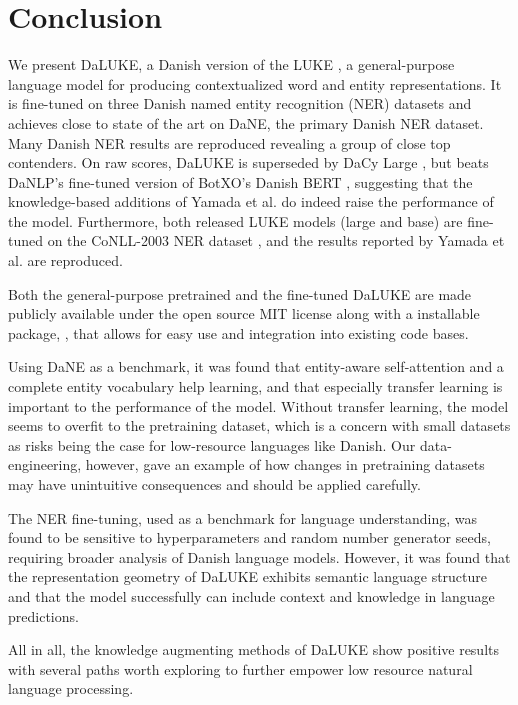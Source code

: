 \documentclass[main.tex]{subfiles}
\begin{document}
\chapter{Conclusion}
We present DaLUKE, a Danish version of the LUKE \cite{yamada2020luke}, a general-purpose language model for producing contextualized word and entity representations.
It is fine-tuned on three Danish named entity recognition (NER) datasets and achieves close to state of the art on DaNE, the primary Danish NER dataset.
Many Danish NER results are reproduced revealing a group of close top contenders.
On raw scores, DaLUKE is superseded by DaCy Large \cite{enevoldsen2020dacy}, but beats DaNLP's fine-tuned version of BotXO's Danish BERT \cite{danlp2021, botxo2019dabert}, suggesting that the knowledge-based additions of Yamada et al. \cite{yamada2020luke} do indeed raise the performance of the model.
Furthermore, both released LUKE models (large and base) are fine-tuned on the CoNLL-2003 NER dataset \cite{tjang2003conll}, and the results reported by Yamada et al. are reproduced.

Both the general-purpose pretrained and the fine-tuned DaLUKE are made publicly available under the open source MIT license \cite{mitlicense} along with a  installable package, , that allows for easy use and integration into existing code bases.

Using DaNE as a benchmark, it was found that entity-aware self-attention and a complete entity vocabulary help learning, and that especially transfer learning is important to the performance of the model.
Without transfer learning, the model seems to overfit to the pretraining dataset, which is a concern with small datasets as risks being the case for low-resource languages like Danish.
Our data-engineering, however, gave an example of how changes in pretraining datasets may have unintuitive consequences and should be applied carefully.

The NER fine-tuning, used as a benchmark for language understanding, was found to be sensitive to hyperparameters and random number generator seeds, requiring broader analysis of Danish language models.
However, it was found that the representation geometry of DaLUKE exhibits semantic language structure and that the model successfully can include context and knowledge in language predictions.

All in all, the knowledge augmenting methods of DaLUKE show positive results with several paths worth exploring to further empower low resource natural language processing.
\end{document}

